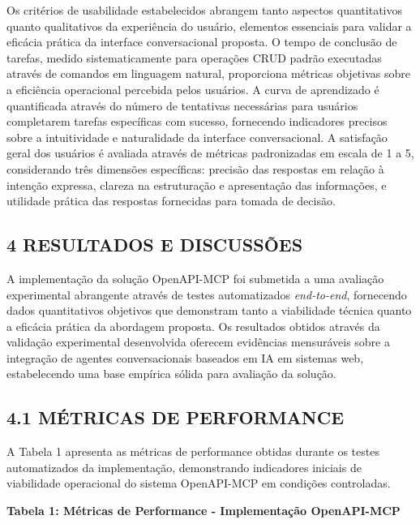 \documentclass[
]{article}
\begin{document}
Os critérios de usabilidade estabelecidos abrangem tanto aspectos
quantitativos quanto qualitativos da experiência do usuário, elementos
essenciais para validar a eficácia prática da interface conversacional
proposta. O tempo de conclusão de tarefas, medido sistematicamente para
operações CRUD padrão executadas através de comandos em linguagem
natural, proporciona métricas objetivas sobre a eficiência operacional
percebida pelos usuários. A curva de aprendizado é quantificada através
do número de tentativas necessárias para usuários completarem tarefas
específicas com sucesso, fornecendo indicadores precisos sobre a
intuitividade e naturalidade da interface conversacional. A satisfação
geral dos usuários é avaliada através de métricas padronizadas em escala
de 1 a 5, considerando três dimensões específicas: precisão das
respostas em relação à intenção expressa, clareza na estruturação e
apresentação das informações, e utilidade prática das respostas
fornecidas para tomada de decisão.

\subsection{4 RESULTADOS E DISCUSSÕES}\label{resultados-e-discussuxf5es}

A implementação da solução OpenAPI-MCP foi submetida a uma avaliação
experimental abrangente através de testes automatizados
\emph{end-to-end}, fornecendo dados quantitativos objetivos que
demonstram tanto a viabilidade técnica quanto a eficácia prática da
abordagem proposta. Os resultados obtidos através da validação
experimental desenvolvida oferecem evidências mensuráveis sobre a
integração de agentes conversacionais baseados em IA em sistemas web,
estabelecendo uma base empírica sólida para avaliação da solução.

\subsection{4.1 MÉTRICAS DE
PERFORMANCE}\label{muxe9tricas-de-performance}

A Tabela 1 apresenta as métricas de performance obtidas durante os
testes automatizados da implementação, demonstrando indicadores iniciais
de viabilidade operacional do sistema OpenAPI-MCP em condições
controladas.

\textbf{Tabela 1: Métricas de Performance - Implementação OpenAPI-MCP}
\end{document}
